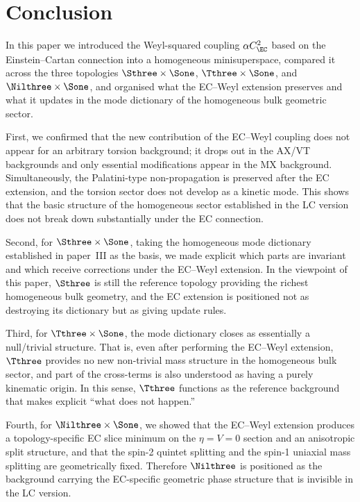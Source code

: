 \section{Conclusion}
\label{sec:conclusion}

In this paper we introduced the Weyl-squared coupling $\alpha C^2_\EC$ based on
the Einstein--Cartan connection into a homogeneous minisuperspace, compared it
across the three topologies $\Sthree\times\Sone$, $\Tthree\times\Sone$, and
$\Nilthree\times\Sone$, and organised what the EC--Weyl extension preserves and
what it updates in the mode dictionary of the homogeneous bulk geometric sector.

First, we confirmed that the new contribution of the EC--Weyl coupling does not
appear for an arbitrary torsion background; it drops out in the AX/VT
backgrounds and only essential modifications appear in the MX background.
Simultaneously, the Palatini-type non-propagation is preserved after the EC
extension, and the torsion sector does not develop as a kinetic mode.  This
shows that the basic structure of the homogeneous sector established in the LC
version does not break down substantially under the EC connection.

Second, for $\Sthree\times\Sone$, taking the homogeneous mode dictionary
established in paper~III as the basis, we made explicit which parts are
invariant and which receive corrections under the EC--Weyl extension.  In the
viewpoint of this paper, $\Sthree$ is still the reference topology providing the
richest homogeneous bulk geometry, and the EC extension is positioned not as
destroying its dictionary but as giving update rules.

Third, for $\Tthree\times\Sone$, the mode dictionary closes as essentially a
null/trivial structure.  That is, even after performing the EC--Weyl extension,
$\Tthree$ provides no new non-trivial mass structure in the homogeneous bulk
sector, and part of the cross-terms is also understood as having a purely
kinematic origin.  In this sense, $\Tthree$ functions as the reference
background that makes explicit ``what does not happen.''

Fourth, for $\Nilthree\times\Sone$, we showed that the EC--Weyl extension
produces a topology-specific EC slice minimum on the $\eta=V=0$ section and an
anisotropic split structure, and that the spin-2 quintet splitting and the
spin-1 uniaxial mass splitting are geometrically fixed.  Therefore $\Nilthree$
is positioned as the background carrying the EC-specific geometric phase
structure that is invisible in the LC version.

